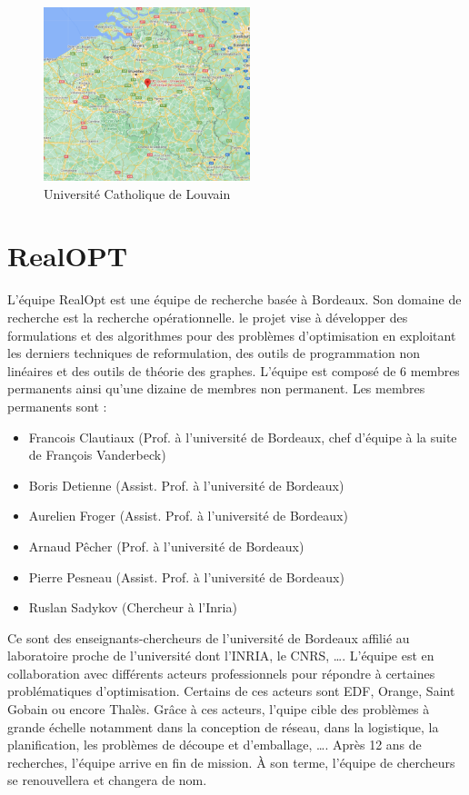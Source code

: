 \documentclass[12pt]{article}
\begin{document}
    \begin{figure}
        \centering
        \includegraphics[width=6cm]{image/Map-UCLouvain.png}
        \caption{Université Catholique de Louvain}
        \label{fig:UC Louvain}
    \end{figure}

    \newpage
    \section{RealOPT}\label{sec:realopt}

    L'équipe RealOpt est une équipe de recherche basée à Bordeaux.
    Son domaine de recherche est la recherche opérationnelle.
    le projet vise à développer des formulations et des algorithmes pour des problèmes d'optimisation en exploitant les derniers techniques de reformulation, des outils de programmation non linéaires et des outils de théorie des graphes.
    L'équipe est composé de 6 membres permanents ainsi qu'une dizaine de membres non permanent.
    Les membres permanents sont :
    \begin{itemize}
        \item Francois Clautiaux  (Prof. à l'université de Bordeaux, chef d'équipe à la suite de
        François Vanderbeck)
        \item Boris Detienne (Assist. Prof. à l'université de Bordeaux)
        \item Aurelien Froger (Assist. Prof. à l'université de Bordeaux)
        \item Arnaud Pêcher (Prof. à l'université de Bordeaux)
        \item Pierre Pesneau (Assist. Prof. à l'université de Bordeaux)
        \item Ruslan Sadykov (Chercheur à l'Inria)
    \end{itemize}
    Ce sont des enseignants-chercheurs de l'université de Bordeaux affilié au laboratoire proche de l'université
    dont l'INRIA, le CNRS, \ldots .
    L'équipe est en collaboration avec différents acteurs professionnels pour répondre à certaines problématiques
    d'optimisation.
    Certains de ces acteurs sont EDF, Orange, Saint Gobain ou encore Thalès. Grâce à ces acteurs, l'quipe cible des problèmes à grande échelle notamment dans la conception de réseau, dans la logistique, la planification, les problèmes de découpe et d'emballage, \ldots .
    Après 12 ans de recherches, l'équipe arrive en fin de mission.
    À son terme, l'équipe de chercheurs se renouvellera et changera de nom.
\end{document}
